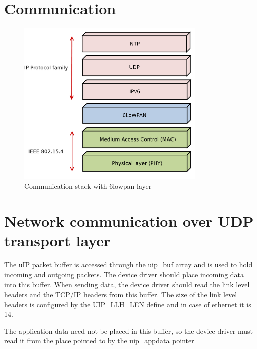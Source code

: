 \section{Communication}
\begin{figure}
  \centering
  \includegraphics[width=9cm,keepaspectratio]{fig/6lowpan.pdf}
  \caption{Communication stack with 6lowpan layer}
  \label{fig:ntp-hierarchy}
  \bigskip
\end{figure}



\section{Network communication over UDP transport layer}
The uIP packet buffer is accessed through
the uip\_buf array and is used to hold incoming and outgoing packets.
The device driver should place incoming data into this buffer.
When sending data, the device driver should read the link
level headers and the TCP/IP headers from this buffer.
The size of the link level headers is configured by the UIP\_LLH\_LEN
define and in case of ethernet it is 14.

The application data need not be placed in this buffer, so
the device driver must read it from the place pointed to by the
uip\_appdata pointer %
